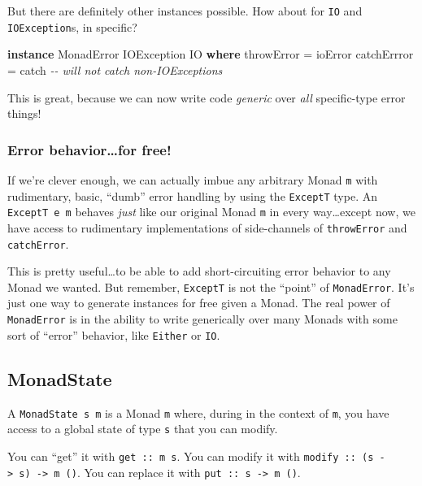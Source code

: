 \documentclass[]{article}
\newenvironment{Shaded}{}{}
\newcommand{\CommentTok}[1]{\textcolor[rgb]{0.38,0.63,0.69}{\textit{#1}}}
\newcommand{\DataTypeTok}[1]{\textcolor[rgb]{0.56,0.13,0.00}{#1}}
\newcommand{\FunctionTok}[1]{\textcolor[rgb]{0.02,0.16,0.49}{#1}}
\newcommand{\KeywordTok}[1]{\textcolor[rgb]{0.00,0.44,0.13}{\textbf{#1}}}
\newcommand{\NormalTok}[1]{#1}
\newcommand{\OtherTok}[1]{\textcolor[rgb]{0.00,0.44,0.13}{#1}}
\begin{document}
But there are definitely other instances possible. How about for \texttt{IO} and
\texttt{IOException}s, in specific?

\begin{Shaded}
\begin{Highlighting}[]
\KeywordTok{instance} \DataTypeTok{MonadError} \DataTypeTok{IOException} \DataTypeTok{IO} \KeywordTok{where}
\NormalTok{    throwError  }\OtherTok{=} \FunctionTok{ioError}
\NormalTok{    catchErrror }\OtherTok{=} \FunctionTok{catch}     \CommentTok{{-}{-} will not catch non{-}IOExceptions}
\end{Highlighting}
\end{Shaded}

This is great, because we can now write code \emph{generic} over \emph{all}
specific-type error things!

\subsubsection{Error behavior\ldots for free!}\label{error-behaviorfor-free}

If we're clever enough, we can actually imbue any arbitrary Monad \texttt{m}
with rudimentary, basic, ``dumb'' error handling by using the \texttt{ExceptT}
type. An \texttt{ExceptT\ e\ m} behaves \emph{just} like our original Monad
\texttt{m} in every way\ldots except now, we have access to rudimentary
implementations of side-channels of \texttt{throwError} and \texttt{catchError}.

This is pretty useful\ldots to be able to add short-circuiting error behavior to
any Monad we wanted. But remember, \texttt{ExceptT} is not the ``point'' of
\texttt{MonadError}. It's just one way to generate instances for free given a
Monad. The real power of \texttt{MonadError} is in the ability to write
generically over many Monads with some sort of ``error'' behavior, like
\texttt{Either} or \texttt{IO}.

\subsection{MonadState}\label{monadstate}

A \texttt{MonadState\ s\ m} is a Monad \texttt{m} where, during in the context
of \texttt{m}, you have access to a global state of type \texttt{s} that you can
modify.

You can ``get'' it with \texttt{get\ ::\ m\ s}. You can modify it with
\texttt{modify\ ::\ (s\ -\textgreater{}\ s)\ -\textgreater{}\ m\ ()}. You can
replace it with \texttt{put\ ::\ s\ -\textgreater{}\ m\ ()}.
\end{document}
